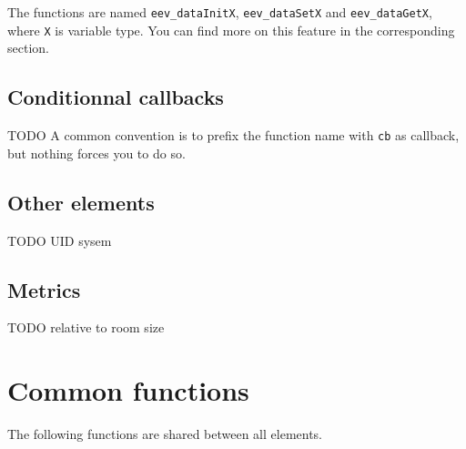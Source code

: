 \documentclass[10pt,a4paper]{scrartcl}
\begin{document}
The functions are named \verb#eev_dataInitX#, \verb#eev_dataSetX# and \verb#eev_dataGetX#, where \verb#X# is variable type. You can find more on this feature in the corresponding section.

\subsection{Conditionnal callbacks}
TODO A common convention is to prefix the function name with \texttt{cb} as callback, but nothing forces you to do so.

\subsection{Other elements}
TODO UID sysem

\subsection{Metrics}
TODO relative to room size

\newpage
\section{Common functions}
The following functions are shared between all elements.
\end{document}
